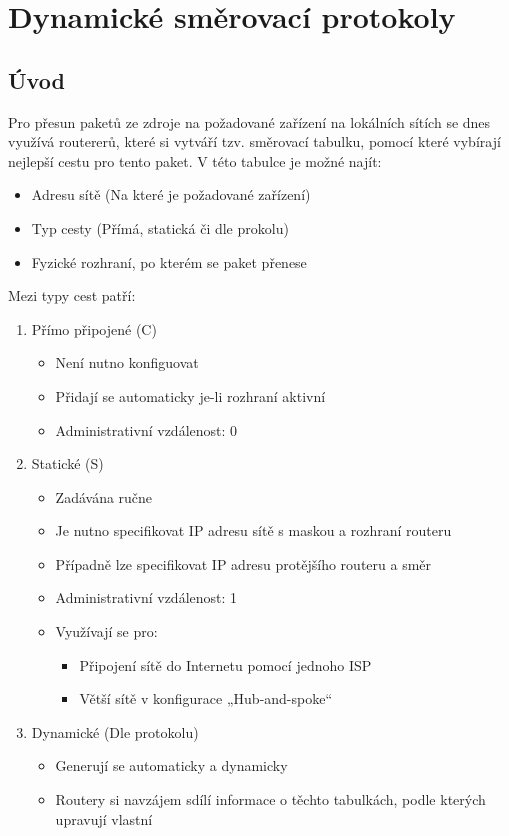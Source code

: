 \section{Dynamické směrovací protokoly}
\subsection{Úvod}
Pro přesun paketů ze zdroje na požadované zařízení na lokálních sítích se dnes využívá routererů, které si vytváří tzv. směrovací tabulku, pomocí které vybírají nejlepší cestu pro tento paket.
V této tabulce je možné najít:
\begin{itemize}
    \item Adresu sítě (Na které je požadované zařízení)
    \item Typ cesty (Přímá, statická či dle prokolu)
    \item Fyzické rozhraní, po kterém se paket přenese
\end{itemize}
Mezi typy cest patří:
\begin{enumerate}
    \item Přímo připojené (C)
          \begin{itemize}
              \item Není nutno konfiguovat
              \item Přidají se automaticky je-li rozhraní aktivní
              \item Administrativní vzdálenost: 0
          \end{itemize}
    \item Statické (S)
          \begin{itemize}
              \item Zadávána ručne
              \item Je nutno specifikovat IP adresu sítě s maskou a rozhraní routeru
              \item Případně lze specifikovat IP adresu protějšího routeru a směr
              \item Administrativní vzdálenost: 1
              \item Využívají se pro:
                    \begin{itemize}
                        \item Připojení sítě do Internetu pomocí jednoho ISP
                        \item Větší sítě v konfigurace „Hub-and-spoke“
                    \end{itemize}
          \end{itemize}
    \item Dynamické (Dle protokolu)
          \begin{itemize}
              \item Generují se automaticky a dynamicky
              \item Routery si navzájem sdílí informace o těchto tabulkách, podle kterých upravují vlastní
          \end{itemize}
\end{enumerate}
